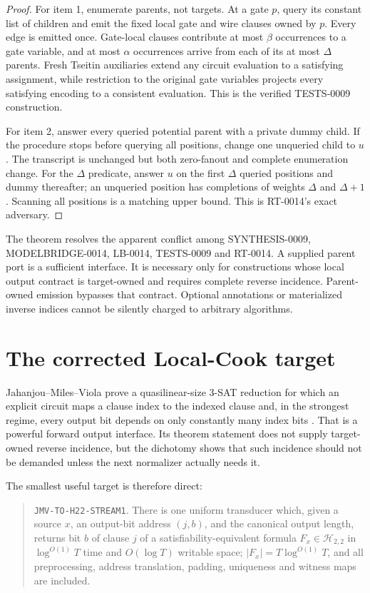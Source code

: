 \documentclass[11pt]{article}
\begin{document}
\begin{proof}
For item 1, enumerate parents, not targets.  At a gate $p$, query its constant
list of children and emit the fixed local gate and wire clauses owned by
$p$.  Every edge is emitted once.  Gate-local clauses contribute at most
$\beta$ occurrences to a gate variable, and at most $\alpha$ occurrences
arrive from each of its at most $\Delta$ parents.  Fresh Tseitin auxiliaries
extend any circuit evaluation to a satisfying assignment, while restriction
to the original gate variables projects every satisfying encoding to a
consistent evaluation.  This is the verified TESTS-0009 construction.

For item 2, answer every queried potential parent with a private dummy child.
If the procedure stops before querying all positions, change one unqueried
child to $u$.  The transcript is unchanged but both zero-fanout and complete
enumeration change.  For the $\Delta$ predicate, answer $u$ on the first
$\Delta$ queried positions and dummy thereafter; an unqueried position has
completions of weights $\Delta$ and $\Delta+1$.  Scanning all positions is a
matching upper bound.  This is RT-0014's exact adversary.
\end{proof}

The theorem resolves the apparent conflict among SYNTHESIS-0009,
MODELBRIDGE-0014, LB-0014, TESTS-0009 and RT-0014.  A supplied parent port is
a sufficient interface.  It is necessary only for constructions whose local
output contract is target-owned and requires complete reverse incidence.
Parent-owned emission bypasses that contract.  Optional annotations or
materialized inverse indices cannot be silently charged to arbitrary
algorithms.

\section{The corrected Local-Cook target}

Jahanjou--Miles--Viola prove a quasilinear-size 3-SAT reduction for which an
explicit circuit maps a clause index to the indexed clause and, in the
strongest regime, every output bit depends on only constantly many index
bits \cite{jmv}.  That is a powerful forward output interface.  Its theorem
statement does not supply target-owned reverse incidence, but the dichotomy
shows that such incidence should not be demanded unless the next normalizer
actually needs it.

The smallest useful target is therefore direct:
\begin{quote}
\texttt{JMV-TO-H22-STREAM1}.  There is one uniform transducer which, given a
source $x$, an output-bit address $(j,b)$, and the canonical output length,
returns bit $b$ of clause $j$ of a satisfiability-equivalent formula
$F_x\in\mathcal H_{2,2}$ in $\log^{O(1)}T$ time and $O(\log T)$ writable
space; $|F_x|=T\log^{O(1)}T$, and all preprocessing, address translation,
padding, uniqueness and witness maps are included.
\end{quote}
\end{document}
